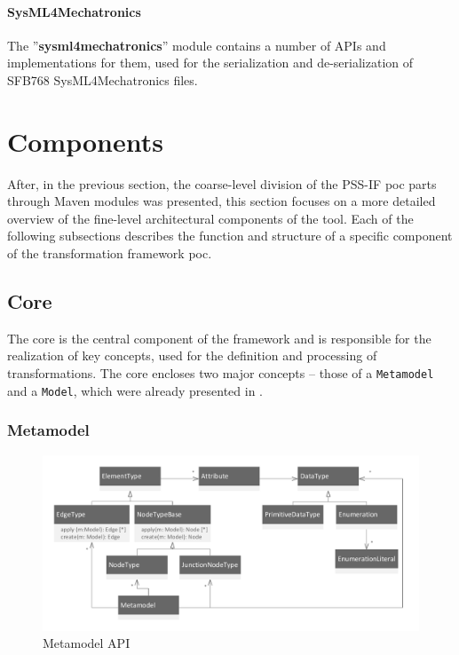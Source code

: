 \paragraph{SysML4Mechatronics} The ''\textbf{sysml4mechatronics}'' module contains a number of APIs and implementations for them, used for the serialization and de-serialization of SFB768 SysML4Mechatronics files.

\section{Components}
\label{sec:impl:components}

After, in the previous section, the coarse-level division of the PSS-IF \gls{poc} parts through Maven modules was presented, this section focuses on a more detailed overview of the fine-level architectural components of the tool. Each of the following subsections describes the function and structure of a specific component of the transformation framework \gls{poc}.

\subsection{Core}

The core is the central component of the framework and is responsible for the realization of key concepts, used for the definition and processing of transformations. The core encloses two major concepts -- those of a \texttt{Metamodel} and a \texttt{Model}, which were already presented in .

\subsubsection{Metamodel}

\begin{figure}
\centering
\includegraphics[width=\textwidth]{figures/metamodel.pdf}
\caption{Metamodel API}
\label{fig:metamodel}
\end{figure}

